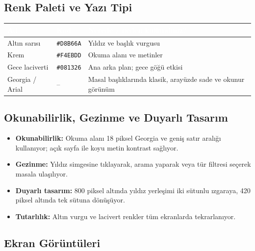 \documentclass[12pt,a4paper]{article}
\begin{document}
\subsection{Renk Paleti ve Yazı Tipi}
\begin{center}
\begin{tabular}{@{}llp{6.4cm}@{}}
\toprule
\rowcolor{ana}\textcolor{white}{\textbf{Ad}} & \textcolor{white}{\textbf{Kod}} & \textcolor{white}{\textbf{Nerede / neden kullandınız?}} \\
\midrule
Altın sarısı & \texttt{\#D8B66A} & Yıldız ve başlık vurgusu \\
Krem & \texttt{\#F4EBDD} & Okuma alanı ve metinler \\
Gece laciverti & \texttt{\#081326} & Ana arka plan; gece göğü etkisi \\
Georgia / Arial & -- & Masal başlıklarında klasik, arayüzde sade ve okunur görünüm \\
\bottomrule
\end{tabular}
\end{center}

\subsection{Okunabilirlik, Gezinme ve Duyarlı Tasarım}
\begin{itemize}
  \item \textbf{Okunabilirlik:} Okuma alanı 18 piksel Georgia ve geniş satır aralığı kullanıyor; açık sayfa ile koyu metin kontrast sağlıyor.
  \item \textbf{Gezinme:} Yıldız simgesine tıklayarak, arama yaparak veya tür filtresi seçerek masala ulaşılıyor.
  \item \textbf{Duyarlı tasarım:} 800 piksel altında yıldız yerleşimi iki sütunlu ızgaraya, 420 piksel altında tek sütuna dönüşüyor.
  \item \textbf{Tutarlılık:} Altın vurgu ve lacivert renkler tüm ekranlarda tekrarlanıyor.
\end{itemize}

\subsection{Ekran Görüntüleri}
\end{document}
